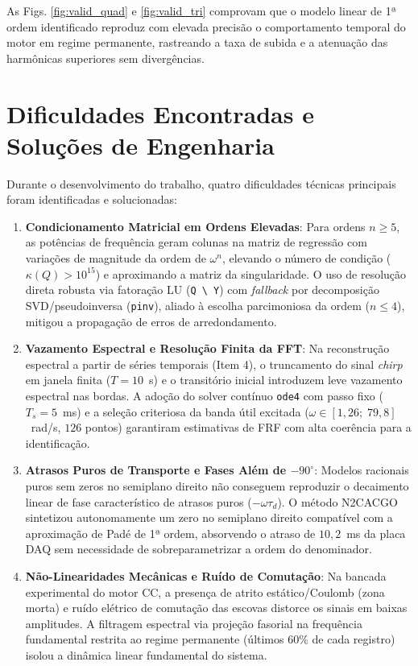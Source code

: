\documentclass[journal,10pt,twocolumn]{IEEEtran}
\begin{document}
As Figs. \ref{fig:valid_quad} e \ref{fig:valid_tri} comprovam que o modelo linear de 1ª ordem identificado reproduz com elevada precisão o comportamento temporal do motor em regime permanente, rastreando a taxa de subida e a atenuação das harmônicas superiores sem divergências.

\section{Dificuldades Encontradas e Soluções de Engenharia}
Durante o desenvolvimento do trabalho, quatro dificuldades técnicas principais foram identificadas e solucionadas:
\begin{enumerate}
    \item \textbf{Condicionamento Matricial em Ordens Elevadas}: Para ordens $n \ge 5$, as potências de frequência geram colunas na matriz de regressão com variações de magnitude da ordem de $\omega^n$, elevando o número de condição ($\kappa(Q) > 10^{15}$) e aproximando a matriz da singularidade. O uso de resolução direta robusta via fatoração LU (\texttt{Q \textbackslash{} Y}) com \textit{fallback} por decomposição SVD/pseudoinversa (\texttt{pinv}), aliado à escolha parcimoniosa da ordem ($n \le 4$), mitigou a propagação de erros de arredondamento.
    \item \textbf{Vazamento Espectral e Resolução Finita da FFT}: Na reconstrução espectral a partir de séries temporais (Item 4), o truncamento do sinal \textit{chirp} em janela finita ($T = 10$~s) e o transitório inicial introduzem leve vazamento espectral nas bordas. A adoção do solver contínuo \texttt{ode4} com passo fixo ($T_s = 5$~ms) e a seleção criteriosa da banda útil excitada ($\omega \in [1,26;\; 79,8]$~rad/s, $126$ pontos) garantiram estimativas de FRF com alta coerência para a identificação.
    \item \textbf{Atrasos Puros de Transporte e Fases Além de $-90^\circ$}: Modelos racionais puros sem zeros no semiplano direito não conseguem reproduzir o decaimento linear de fase característico de atrasos puros ($-\omega \tau_d$). O método N2CACGO sintetizou autonomamente um zero no semiplano direito compatível com a aproximação de Padé de 1ª ordem, absorvendo o atraso de $10,2$~ms da placa DAQ sem necessidade de sobreparametrizar a ordem do denominador.
    \item \textbf{Não-Linearidades Mecânicas e Ruído de Comutação}: Na bancada experimental do motor CC, a presença de atrito estático/Coulomb (zona morta) e ruído elétrico de comutação das escovas distorce os sinais em baixas amplitudes. A filtragem espectral via projeção fasorial na frequência fundamental restrita ao regime permanente (últimos 60\% de cada registro) isolou a dinâmica linear fundamental do sistema.
\end{enumerate}
\end{document}
